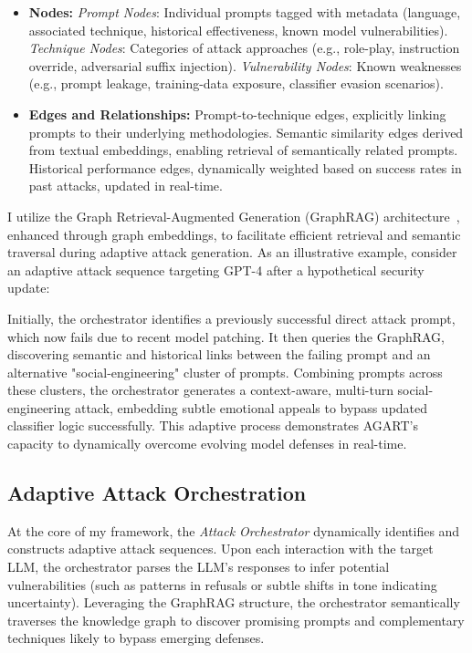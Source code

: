 \documentclass[manuscript,screen,review]{acmart}
\begin{document}
\begin{itemize}
    \item \textbf{Nodes:} \emph{Prompt Nodes}: Individual prompts tagged with metadata (language, associated technique, historical effectiveness, known model vulnerabilities). \emph{Technique Nodes}: Categories of attack approaches (e.g., role-play, instruction override, adversarial suffix injection). \emph{Vulnerability Nodes}: Known weaknesses (e.g., prompt leakage, training-data exposure, classifier evasion scenarios).
    \item \textbf{Edges and Relationships:} Prompt-to-technique edges, explicitly linking prompts to their underlying methodologies. Semantic similarity edges derived from textual embeddings, enabling retrieval of semantically related prompts. Historical performance edges, dynamically weighted based on success rates in past attacks, updated in real-time.
\end{itemize}

I utilize the Graph Retrieval-Augmented Generation (GraphRAG) architecture~\cite{peng2024graph}, enhanced through graph embeddings, to facilitate efficient retrieval and semantic traversal during adaptive attack generation. As an illustrative example, consider an adaptive attack sequence targeting GPT-4 after a hypothetical security update:

Initially, the orchestrator identifies a previously successful direct attack prompt, which now fails due to recent model patching. It then queries the GraphRAG, discovering semantic and historical links between the failing prompt and an alternative "social-engineering" cluster of prompts. Combining prompts across these clusters, the orchestrator generates a context-aware, multi-turn social-engineering attack, embedding subtle emotional appeals to bypass updated classifier logic successfully. This adaptive process demonstrates AGART’s capacity to dynamically overcome evolving model defenses in real-time.

\subsection{Adaptive Attack Orchestration}

At the core of my framework, the \textit{Attack Orchestrator} dynamically identifies and constructs adaptive attack sequences. Upon each interaction with the target LLM, the orchestrator parses the LLM’s responses to infer potential vulnerabilities (such as patterns in refusals or subtle shifts in tone indicating uncertainty). Leveraging the GraphRAG structure, the orchestrator semantically traverses the knowledge graph to discover promising prompts and complementary techniques likely to bypass emerging defenses.
\end{document}
